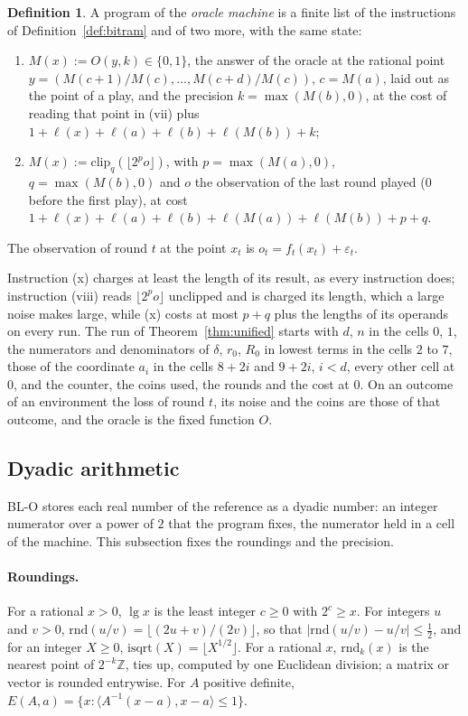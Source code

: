 \documentclass[11pt]{amsart}
\theoremstyle{definition}
\newtheorem{definition}[theorem]{Definition}
\numberwithin{equation}{section}
\newcommand{\ip}[1]{\langle #1\rangle}
\begin{document}
\begin{definition}\label{def:bitramo}
A program of the \emph{oracle machine} is a finite list of the instructions of Definition~\ref{def:bitram} and of two more, with the same state:
\begin{enumerate}[label=(\roman*),start=9]
\item $M(x):=O(y,k)\in\{0,1\}$, the answer of the oracle at the rational point $y=(M(c+1)/M(c),\dots,M(c+d)/M(c))$, $c=M(a)$, laid out as the point of a play, and the precision $k=\max(M(b),0)$, at the cost of reading that point in (vii) plus $1+\ell(x)+\ell(a)+\ell(b)+\ell(M(b))+k$;
\item $M(x):=\mathrm{clip}_q(\lfloor2^po\rfloor)$, with $p=\max(M(a),0)$, $q=\max(M(b),0)$ and $o$ the observation of the last round played ($0$ before the first play), at cost $1+\ell(x)+\ell(a)+\ell(b)+\ell(M(a))+\ell(M(b))+p+q$.
\end{enumerate}
The observation of round $t$ at the point $x_t$ is $o_t=f_t(x_t)+\varepsilon_t$.
\end{definition}

Instruction (x) charges at least the length of its result, as every instruction does; instruction (viii) reads $\lfloor2^po\rfloor$ unclipped and is charged its length, which a large noise makes large, while (x) costs at most $p+q$ plus the lengths of its operands on every run. The run of Theorem~\ref{thm:unified} starts with $d$, $n$ in the cells $0$, $1$, the numerators and denominators of $\delta$, $r_0$, $R_0$ in lowest terms in the cells $2$ to $7$, those of the coordinate $a_i$ in the cells $8+2i$ and $9+2i$, $i<d$, every other cell at $0$, and the counter, the coins used, the rounds and the cost at $0$.
On an outcome of an environment the loss of round $t$, its noise and the coins are those of that outcome, and the oracle is the fixed function $O$.
\subsection{Dyadic arithmetic}\label{sec:bit-arith}

BL-O stores each real number of the reference as a dyadic number: an integer numerator over a power of $2$ that the program fixes, the numerator held in a cell of the machine. This subsection fixes the roundings and the precision.

\paragraph{Roundings.} For a rational $x>0$, $\lg x$ is the least integer $c\ge0$ with $2^c\ge x$. For integers $u$ and $v>0$, $\mathrm{rnd}(u/v)=\lfloor(2u+v)/(2v)\rfloor$, so that $|\mathrm{rnd}(u/v)-u/v|\le\frac12$, and for an integer $X\ge0$, $\mathrm{isqrt}(X)=\lfloor X^{1/2}\rfloor$. For a rational $x$, $\mathrm{rnd}_k(x)$ is the nearest point of $2^{-k}\mathbb Z$, ties up, computed by one Euclidean division; a matrix or vector is rounded entrywise. For $A$ positive definite, $E(A,a)=\{x:\ip{A^{-1}(x-a),x-a}\le1\}$.
\end{document}
